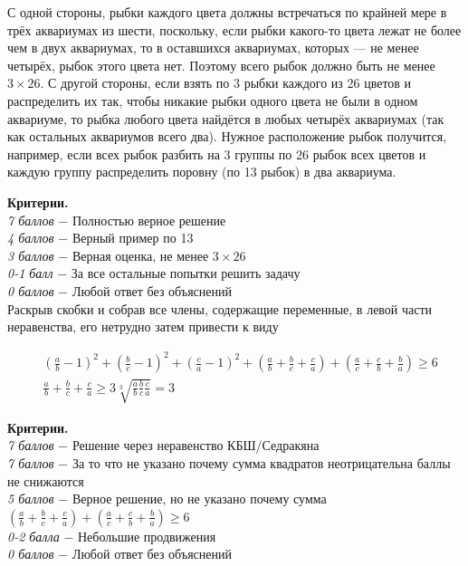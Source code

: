  С одной стороны, рыбки каждого цвета должны встречаться по крайней мере в трёх аквариумах из шести, поскольку, если рыбки какого-то цвета лежат не более чем в двух аквариумах, то в оставшихся аквариумах, которых — не менее четырёх, рыбок этого цвета нет. Поэтому всего рыбок должно быть не менее $3\times26$. С другой стороны, если взять по 3 рыбки каждого из 26 цветов и распределить их так, чтобы никакие рыбки одного цвета не были в одном аквариуме, то рыбка любого цвета найдётся в любых четырёх аквариумах (так как остальных аквариумов всего два). Нужное расположение рыбок получится, например, если всех рыбок разбить на 3 группы по 26 рыбок всех цветов и каждую группу распределить поровну (по 13 рыбок) в два аквариума.

\textbf{Критерии.} \\
\textit{7 баллов} $-$ Полностью верное решение\\
\textit{4 баллов} $-$ Верный пример по 13\\
\textit{3 баллов} $-$ Верная оценка, не менее $3\times26$\\
\textit{0-1 балл} $-$ За все остальные попытки решить задачу\\
\textit{0 баллов} $-$ Любой ответ без объяснений\\

Раскрыв скобки и собрав все члены, содержащие переменные, в левой части неравенства, его нетрудно затем привести к виду

$$
\begin{aligned}
& \left(\frac{a}{b}-1\right)^2+\left(\frac{b}{c}-1\right)^2+\left(\frac{c}{a}-1\right)^2+\left(\frac{a}{b}+\frac{b}{c}+\frac{c}{a}\right)+\left(\frac{a}{c}+\frac{c}{b}+\frac{b}{a}\right) \geq 6 \\
& \frac{a}{b}+\frac{b}{c}+\frac{c}{a} \geq 3 \sqrt[3]{\frac{a}{b} \frac{b}{c} \frac{c}{a}}=3
\end{aligned}
$$



\textbf{Критерии.} \\
\textit{7 баллов} $-$ Решение через неравенство КБШ/Седракяна\\
\textit{7 баллов} $-$ За то что не указано почему сумма квадратов неотрицательна баллы не снижаются\\
\textit{5 баллов} $-$ Верное решение, но не указано почему сумма $\left(\frac{a}{b}+\frac{b}{c}+\frac{c}{a}\right)+\left(\frac{a}{c}+\frac{c}{b}+\frac{b}{a}\right) \geqslant 6$\\
\textit{0-2 балла} $-$  Небольшие продвижения\\ 
\textit{0 баллов} $-$ Любой ответ без объяснений\\

